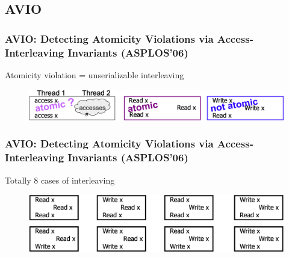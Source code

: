 \subsection{AVIO} %
\begin{frame}[fragile]
    \frametitle{AVIO: \small{Detecting Atomicity Violations via Access-Interleaving Invariants (ASPLOS’06)}}

Atomicity violation = unserializable interleaving

    \begin{figure}
    \includegraphics[width=1.0\linewidth]{figs/serialization.png}
    \end{figure}
\end{frame}
% 
% 
% 
% 
% 
\begin{frame}[fragile]
    \frametitle{AVIO: \small{Detecting Atomicity Violations via Access-Interleaving Invariants (ASPLOS’06)}}

Totally 8 cases of interleaving

    \begin{figure}
    \includegraphics[width=1.0\linewidth]{figs/interleaving-cases.png}
    \end{figure}
\end{frame}
% 
% 
